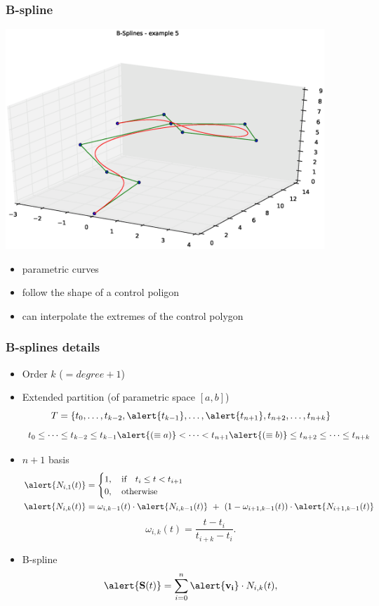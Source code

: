 \begin{frame}
  \frametitle{B-spline}
  \begin{center}
    \includegraphics[width=0.9\textwidth, trim=110 30 50 50, clip]{img/bspline.eps}
  \end{center}
  \pause
  \begin{itemize}
  \item \alert{parametric} curves\pause
  \item follow the shape of a \alert{control poligon}\pause
  \item can interpolate the
    \alert{extremes} of the control polygon
  \end{itemize}
\end{frame}

\begin{frame}
  \frametitle{B-splines details}
  \begin{itemize}
  \item \alert{Order $k$} ($= degree + 1$)\pause
  \item Extended \alert{partition} (of parametric
    space \alert{$[a,b]$})
    $$
    T=\{t_0,\dots,t_{k-2},\alert{t_{k-1}},\dots,\alert{t_{n+1}},t_{n+2},\dots,t_{n+k}\}
    $$
    {\tiny
      $$
      t_0\leq\dots\leq t_{k-2}\leq t_{k-1}\alert{(\equiv a)} <\dots<
      t_{n+1}\alert{(\equiv b)} \leq t_{n+2}\leq\dots\leq t_{n+k}
      $$
    }\pause
  \item \alert{$n+1$ basis}
    {\small
      \begin{align*}
        \alert{N_{i,1}(t)} &=
                     \begin{cases}
                       1,\quad \mbox{if}\quad t_i\leq t<t_{i+1}\\
                       0,\quad \mbox{otherwise}
                     \end{cases}\\
        \alert{N_{i,k}(t)} &= \omega_{i,k-1}(t)\cdot \alert{N_{i,k-1}(t)}\ +\
                     (1-\omega_{i+1,k-1}(t))\cdot \alert{N_{i+1,k-1}(t)}
      \end{align*}
    }
    {\tiny
      $$
      \omega_{i,k}(t) = \frac{t-t_i}{t_{i+k}-t_i}.
      $$
    }\pause
  \item B-spline
    $$
    \alert{\mathbf{S}(t)}=\sum_{i=0}^n\alert{\mathbf{v_i}}\cdot N_{i,k}(t),
    $$
  \end{itemize}
\end{frame}


